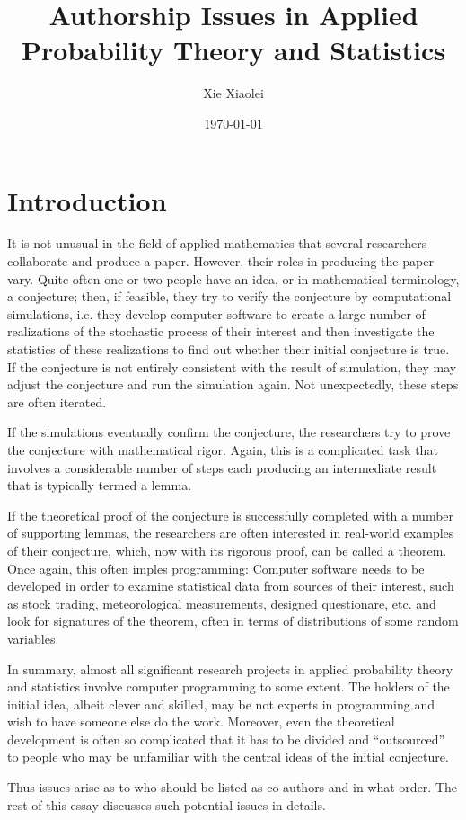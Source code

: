 \documentclass{article}
\title{Authorship Issues in Applied Probability Theory and Statistics}
\author{Xie Xiaolei}
\date{\today}
\begin{document}
\maketitle

\section{Introduction}
It is not unusual in the field of applied mathematics that several
researchers collaborate and produce a paper. However, their roles in
producing the paper vary. Quite often one or two people have an idea,
or in mathematical terminology, a conjecture; then, if feasible, they
try to verify the conjecture by computational simulations, i.e. they
develop computer software to create a large number of
realizations of the stochastic process of their interest and then
investigate the statistics of these realizations to find out whether
their initial conjecture is true. If the conjecture is not entirely
consistent with the result of simulation, they may adjust the
conjecture and run the simulation again. Not unexpectedly, these steps
are often iterated.

If the simulations eventually confirm the conjecture, the researchers
try to prove the conjecture with mathematical rigor. Again, this is a
complicated task that involves a considerable number of steps each
producing an intermediate result that is typically termed a lemma.

If the theoretical proof of the conjecture is successfully completed
with a number of supporting lemmas, the researchers are often
interested in real-world examples of their conjecture, which, now with
its rigorous proof, can be called a theorem. Once again, this often
imples programming: Computer software needs to be developed in order
to examine statistical data from sources of their interest, such as
stock trading, meteorological measurements, designed questionare,
etc. and look for signatures of the theorem, often in terms of
distributions of some random variables.

In summary, almost all significant research projects in applied
probability theory and statistics involve computer programming to some
extent. The holders of the initial idea, albeit clever and skilled,
may be not experts in programming and wish to have someone else do the work.
Moreover, even the theoretical development is often so
complicated that it has to be divided and ``outsourced'' to people who
may be unfamiliar with the central ideas of the initial conjecture.

Thus issues arise as to who should be listed as co-authors and in what
order. The rest of this essay discusses such potential issues in
details.
\end{document}
